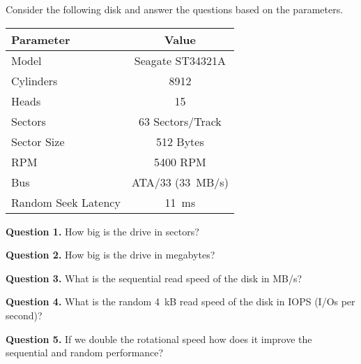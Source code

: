 \documentclass[letterpaper,twocolumn,10pt]{article}
\begin{document}
Consider the following disk and answer the questions based on the parameters.

\begin{table}[h!]
\centering
\begin{tabular}{l|c}
\toprule
{\bf Parameter} & {\bf Value} \\
\midrule
Model & Seagate ST34321A \\
Cylinders & 8912 \\
Heads & 15 \\
Sectors & 63 Sectors/Track \\
Sector Size & 512 Bytes \\
RPM & 5400 RPM \\
Bus & ATA/33 (33~MB/s) \\
Random Seek Latency & 11~ms \\
\bottomrule
\end{tabular}
\end{table}

\noindent
\textbf{Question 1.} How big is the drive in sectors?

\vspace{12em}

\noindent
\textbf{Question 2.} How big is the drive in megabytes?

\vspace{12em}

\noindent
\textbf{Question 3.} What is the sequential read speed of the disk in MB/s?

\vspace{15em}

\break

\noindent
\textbf{Question 4.} What is the random 4~kB read speed of the disk in IOPS 
(I/Os per second)?

\vspace{24em}

\noindent
\textbf{Question 5.} If we double the rotational speed how does it improve the 
sequential and random performance?

\vspace{24em}
\end{document}
